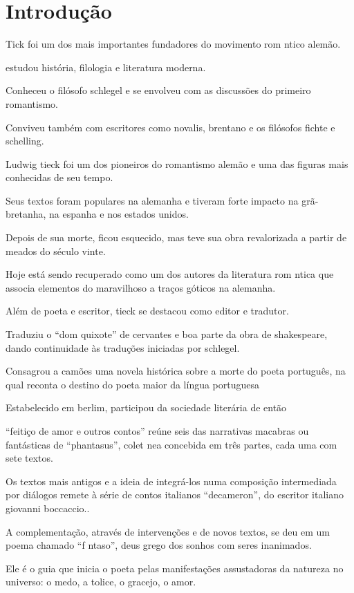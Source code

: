 \documentclass[11pt]{extarticle}
\begin{document}
\tableofcontents

\section{Introdução}

Tick foi um dos mais importantes fundadores do movimento rom ntico alemão. 


estudou história, filologia e literatura moderna.

Conheceu o filósofo schlegel e se envolveu com as discussões do primeiro romantismo. 

Conviveu também com escritores como novalis, brentano e os filósofos fichte e schelling. 

Ludwig tieck foi um dos pioneiros do romantismo alemão e uma das figuras mais conhecidas de seu tempo. 

Seus textos foram populares na alemanha e tiveram forte impacto na grã-bretanha, na espanha e nos estados unidos.

Depois de sua morte, ficou esquecido, mas teve sua obra revalorizada a partir de meados do século vinte. 

Hoje está sendo recuperado como um dos autores  da literatura rom ntica que associa elementos do maravilhoso a traços góticos na alemanha.

Além de poeta e escritor, tieck se destacou como editor e tradutor.

Traduziu o “dom quixote” de cervantes e boa parte da obra de shakespeare, dando continuidade às traduções iniciadas por schlegel.

Consagrou a camões uma novela histórica sobre a morte do poeta português, na qual reconta o destino do poeta maior da língua portuguesa 

Estabelecido em berlim, participou da sociedade literária de então 

“feitiço de amor e outros contos” reúne seis das narrativas macabras ou fantásticas de “phantasus”, colet nea concebida em três partes, cada uma com sete textos. 

Os textos mais antigos e a ideia de integrá-los numa composição intermediada por diálogos remete à série de contos italianos “decameron”, do escritor italiano giovanni boccaccio.. 

A complementação, através de intervenções e de novos textos, se deu em um poema chamado “f ntaso”, deus grego dos sonhos com seres inanimados. 

Ele é o guia que inicia o poeta pelas manifestações assustadoras da natureza no universo: o medo, a tolice, o gracejo, o amor.
\end{document}
